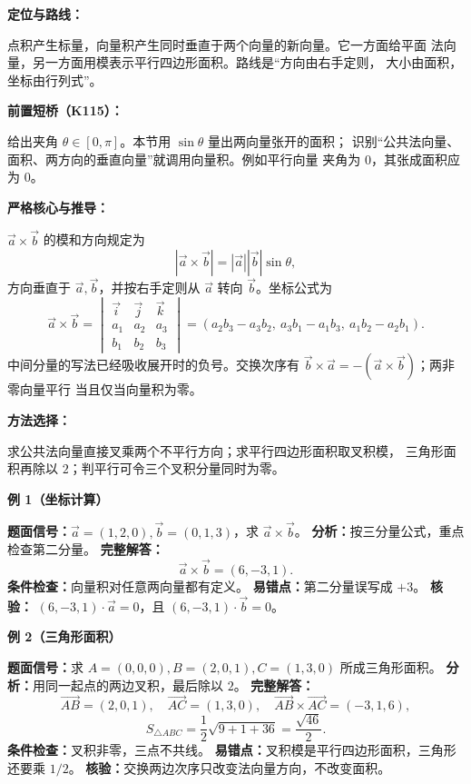 \begin{knowledgeBox}
\textbf{定位与路线：}

点积产生标量，向量积产生同时垂直于两个向量的新向量。它一方面给平面
法向量，另一方面用模表示平行四边形面积。路线是“方向由右手定则，
大小由面积，坐标由行列式”。

\textbf{前置短桥（K115）：}

给出夹角
\(\theta\in[0,\pi]\)。本节用 \(\sin\theta\) 量出两向量张开的面积；
识别“公共法向量、面积、两方向的垂直向量”就调用向量积。例如平行向量
夹角为 \(0\)，其张成面积应为 \(0\)。

\textbf{严格核心与推导：}

\(\vec a\times\vec b\) 的模和方向规定为
\[
|\vec a\times\vec b|=|\vec a||\vec b|\sin\theta,
\]
方向垂直于 \(\vec a,\vec b\)，并按右手定则从 \(\vec a\) 转向
\(\vec b\)。坐标公式为
\[
\vec a\times\vec b=
\begin{vmatrix}
\vec i&\vec j&\vec k\\
a_1&a_2&a_3\\
b_1&b_2&b_3
\end{vmatrix}
=(a_2b_3-a_3b_2,\ a_3b_1-a_1b_3,\ a_1b_2-a_2b_1).
\]
中间分量的写法已经吸收展开时的负号。交换次序有
\(\vec b\times\vec a=-(\vec a\times\vec b)\)；两非零向量平行
当且仅当向量积为零。

\textbf{方法选择：}

求公共法向量直接叉乘两个不平行方向；求平行四边形面积取叉积模，
三角形面积再除以 \(2\)；判平行可令三个叉积分量同时为零。

\textbf{例 1（坐标计算）}

\textbf{题面信号：}\(\vec a=(1,2,0),\vec b=(0,1,3)\)，求
\(\vec a\times\vec b\)。
\textbf{分析：}按三分量公式，重点检查第二分量。
\textbf{完整解答：}
\[
\vec a\times\vec b=(6,-3,1).
\]
\textbf{条件检查：}向量积对任意两向量都有定义。
\textbf{易错点：}第二分量误写成 \(+3\)。
\textbf{核验：}
\((6,-3,1)\cdot\vec a=0\)，且
\((6,-3,1)\cdot\vec b=0\)。

\textbf{例 2（三角形面积）}

\textbf{题面信号：}求 \(A=(0,0,0),B=(2,0,1),C=(1,3,0)\)
所成三角形面积。
\textbf{分析：}用同一起点的两边叉积，最后除以 \(2\)。
\textbf{完整解答：}
\[
\overrightarrow{AB}=(2,0,1),\quad
\overrightarrow{AC}=(1,3,0),\quad
\overrightarrow{AB}\times\overrightarrow{AC}=(-3,1,6),
\]
\[
S_{\triangle ABC}=\frac12\sqrt{9+1+36}=\frac{\sqrt{46}}2.
\]
\textbf{条件检查：}叉积非零，三点不共线。
\textbf{易错点：}叉积模是平行四边形面积，三角形还要乘 \(1/2\)。
\textbf{核验：}交换两边次序只改变法向量方向，不改变面积。


\end{knowledgeBox}
